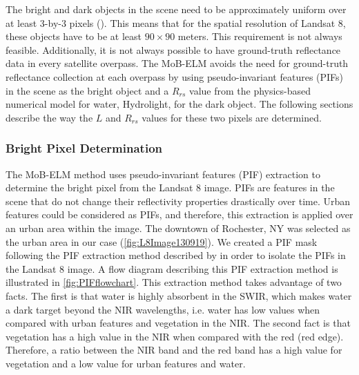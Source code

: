 \documentclass[onecolumn,3p,letterpaper]{elsarticle}
\begin{document}
The bright and dark objects in the scene need to be approximately uniform over at least 3-by-3 pixels (\cite{Schott}). This means that for the spatial resolution of Landsat 8, these objects have to be at least $90\times 90$ meters. This requirement is not always feasible. Additionally, it is not always possible to have ground-truth reflectance data in every satellite overpass. The MoB-ELM avoids the need for ground-truth  reflectance collection at each overpass by using pseudo-invariant features (PIFs) in the scene as the bright object and a $R_{rs}$ value from the physics-based numerical model for water, Hydrolight, for the dark object. The following sections describe the way the $L$ and $R_{rs}$ values for these two pixels are determined.

\subsubsection{Bright Pixel Determination}

The MoB-ELM method uses pseudo-invariant features (PIF) extraction to determine the bright pixel from the Landsat 8 image. PIFs are features in the scene that do not change their reflectivity properties drastically over time. Urban features could be considered as PIFs, and therefore, this extraction is applied over an urban area within the image. The downtown of Rochester, NY was selected as the urban area in our case (\autoref{fig:L8Image130919}). We created a PIF mask following the PIF extraction method described by \cite{Schott:1988} in order to isolate the PIFs in the Landsat 8 image. A flow diagram describing this PIF extraction method is illustrated in \autoref{fig:PIFflowchart}. This extraction method takes advantage of two facts. The first is that water is highly absorbent in the SWIR, which makes water a dark target beyond the NIR wavelengths, i.e. water has low values when compared with urban features and vegetation in the NIR. The second fact is that vegetation has a high value in the NIR when compared with the red (red edge). Therefore, a ratio between the NIR band and the red band has a high value for vegetation and a low value for urban features and water. 
\end{document}
